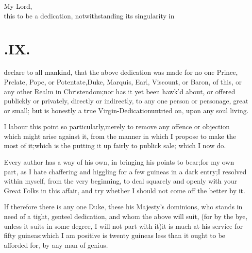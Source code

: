 \documentclass{article}
\begin{document}
My Lord,\\[-24pt]
 this to
be a dedication,\break
notwithstanding its singularity in\break
{}

\noindent{}
\vskip 36pt
\newpage
\section{.\enspace IX.}

 declare to all mankind,
that the above dedication was made for no one Prince, Prelate,
Pope, or Potentate,\tsk  Duke, Marquis, Earl, Viscount, or Baron, of this, or any other Realm in
Christendom;\tsh  nor has it yet been hawk’d about, or
offered publickly or privately, directly or indirectly, to any one
person or personage, great or small; but is honestly a true
Virgin-Dedication\break untried on, upon any soul living.

I labour this point so particularly,\break merely to remove any
offence or objection which might arise against it, from the manner
in which I propose to make the most of it;\tsk  which is the
putting it up fairly to publick sale; which I now do.

\tsh  Every author has a way of his
own, in bringing his points to bear;\tsk  for
my own part, as I hate chaffering and
higgling for a few guineas in a dark\break
entry;\tsk  I resolved within myself, from
the very beginning, to deal squarely and 
openly with your Great Folks in this affair, 
and try whether I should not come
off the better by it.

If therefore there is any one Duke, 
{these his Majesty’s dominions, who stands}
{in need of a tight, genteel dedication,}
{and whom the above will suit, (for by}
{the bye, unless it suits in some degree, I}
{will not part with it)\tsh  it is much at}
his service for fifty guineas;\tsh  which
I am positive is twenty guineas less
than it ought to be afforded for, by any man of genius.
\end{document}
